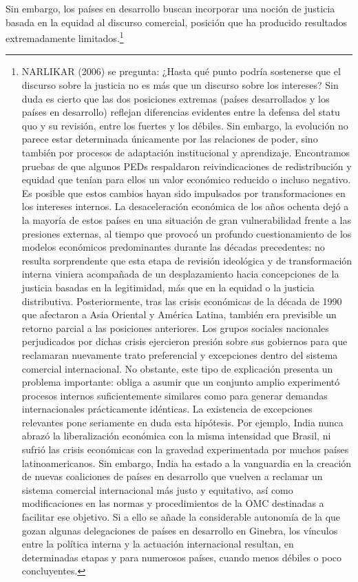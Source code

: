 \documentclass[10pt,a4paper]{article}
\begin{document}
Sin embargo, los países en desarrollo buscan incorporar una noción de justicia basada en la equidad al discurso comercial, posición que ha producido resultados extremadamente limitados.\footnote{%
    NARLIKAR (2006) se pregunta: ¿Hasta qué punto podría sostenerse que el discurso sobre la justicia no es más que un discurso sobre los intereses? Sin duda es cierto que las dos posiciones extremas (países desarrollados y los países en desarrollo) reflejan diferencias evidentes entre la defensa del statu quo y su revisión, entre los fuertes y los débiles. Sin embargo, la evolución no parece estar determinada únicamente por las relaciones de poder, sino también por procesos de adaptación institucional y aprendizaje. Encontramos pruebas de que algunos PEDs respaldaron reivindicaciones de redistribución y equidad que tenían para ellos un valor económico reducido o incluso negativo. Es posible que estos cambios hayan sido impulsados por transformaciones en los intereses internos. La desaceleración económica de los años ochenta dejó a la mayoría de estos países en una situación de gran vulnerabilidad frente a las presiones externas, al tiempo que provocó un profundo cuestionamiento de los modelos económicos predominantes durante las décadas precedentes: no resulta sorprendente que esta etapa de revisión ideológica y de transformación interna viniera acompañada de un desplazamiento hacia concepciones de la justicia basadas en la legitimidad, más que en la equidad o la justicia distributiva. Posteriormente, tras las crisis económicas de la década de 1990 que afectaron a Asia Oriental y América Latina, también era previsible un retorno parcial a las posiciones anteriores. Los grupos sociales nacionales perjudicados por dichas crisis ejercieron presión sobre sus gobiernos para que reclamaran nuevamente trato preferencial y excepciones dentro del sistema comercial internacional. No obstante, este tipo de explicación presenta un problema importante: obliga a asumir que un conjunto amplio experimentó procesos internos suficientemente similares como para generar demandas internacionales prácticamente idénticas. La existencia de excepciones relevantes pone seriamente en duda esta hipótesis. Por ejemplo, India nunca abrazó la liberalización económica con la misma intensidad que Brasil, ni sufrió las crisis económicas con la gravedad experimentada por muchos países latinoamericanos. Sin embargo, India ha estado a la vanguardia en la creación de nuevas coaliciones de países en desarrollo que vuelven a reclamar un sistema comercial internacional más justo y equitativo, así como modificaciones en las normas y procedimientos de la OMC destinadas a facilitar ese objetivo. Si a ello se añade la considerable autonomía de la que gozan algunas delegaciones de países en desarrollo en Ginebra, los vínculos entre la política interna y la actuación internacional resultan, en determinadas etapas y para numerosos países, cuando menos débiles o poco concluyentes.
} 
\end{document}
